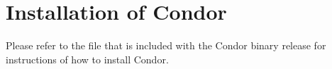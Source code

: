 \section{Installation of Condor}
\label{sec:install}

Please refer to the  file that is included with the
Condor binary release for instructions of how to install Condor.

